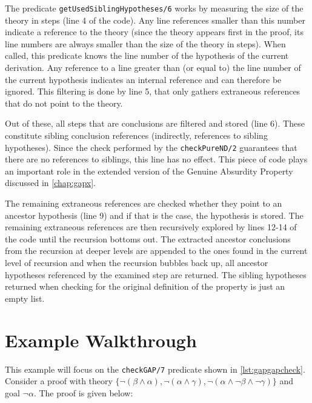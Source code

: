 \documentclass[11pt,twoside,a4paper]{report}
\begin{document}
The predicate \lstinline$getUsedSiblingHypotheses/6$ works by measuring the size of the theory in steps (line 4 of the code). Any line references smaller than this number indicate a reference to the theory (since the theory appears first in the proof, its line numbers are always smaller than the size of the theory in steps). When called, this predicate knows the line number of the hypothesis of the current derivation. Any reference to a line greater than (or equal to) the line number of the current hypothesis indicates an internal reference and can therefore be ignored. This filtering is done by line 5, that only gathers extraneous references that do not point to the theory. 

Out of these, all steps that are conclusions are filtered and stored (line 6). These constitute sibling conclusion references (indirectly, references to sibling hypotheses). Since the check performed by the \lstinline$checkPureND/2$ guarantees that there are no references to siblings, this line has no effect. This piece of code plays an important role in the extended version of the Genuine Absurdity Property discussed in \autoref{chap:gapx}.

The remaining extraneous references are checked whether they point to an ancestor hypothesis (line 9) and if that is the case, the hypothesis is stored. The remaining extraneous references are then recursively explored by lines 12-14 of the code until the recursion bottoms out. The extracted ancestor conclusions from the recursion at deeper levels are appended to the ones found in the current level of recursion and when the recursion bubbles back up, all ancestor hypotheses referenced by the examined step are returned. The sibling hypotheses returned when checking for the original definition of the property is just an empty list.

\section{Example Walkthrough}
This example will focus on the \lstinline$checkGAP/7$ predicate shown in \autoref{lst:gapgapcheck}. Consider a proof with theory $\{\neg(\beta\wedge\alpha), \neg(\alpha\wedge\gamma), \neg(\alpha\wedge\neg\beta\wedge\neg\gamma)\}$ and goal $\neg\alpha$. The proof is given below: 
\end{document}
